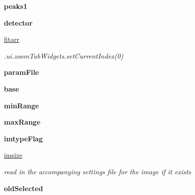 \begin{DoxyCompactItemize}
\item 
\hypertarget{classAtrex_1_1Atrex_ace3b741c1a559e2117246a53d3e8f345}{{\bfseries peaks1}}\label{classAtrex_1_1Atrex_ace3b741c1a559e2117246a53d3e8f345}

\item 
\hypertarget{classAtrex_1_1Atrex_a47354f98e68c5aadcd988d0a2b476889}{{\bfseries detector}}\label{classAtrex_1_1Atrex_a47354f98e68c5aadcd988d0a2b476889}

\item 
\hypertarget{classAtrex_1_1Atrex_a7efc2659254ab5a5f065a5f3fa11ceb9}{\hyperlink{classAtrex_1_1Atrex_a7efc2659254ab5a5f065a5f3fa11ceb9}{fitarr}}\label{classAtrex_1_1Atrex_a7efc2659254ab5a5f065a5f3fa11ceb9}

\begin{DoxyCompactList}\small\item\em .ui.\-zoom\-Tab\-Widgets.\-set\-Current\-Index(0) \end{DoxyCompactList}\item 
\hypertarget{classAtrex_1_1Atrex_a804307169058c96d52235bacc92d6f09}{{\bfseries param\-File}}\label{classAtrex_1_1Atrex_a804307169058c96d52235bacc92d6f09}

\item 
\hypertarget{classAtrex_1_1Atrex_a2080a9ed5c4661217ebd6fa108ef2e68}{{\bfseries base}}\label{classAtrex_1_1Atrex_a2080a9ed5c4661217ebd6fa108ef2e68}

\item 
\hypertarget{classAtrex_1_1Atrex_a8cb32e63ba2e1df2a5819e6df5bfd8e9}{{\bfseries min\-Range}}\label{classAtrex_1_1Atrex_a8cb32e63ba2e1df2a5819e6df5bfd8e9}

\item 
\hypertarget{classAtrex_1_1Atrex_a240f5adcbd64d4282c41fc884722d453}{{\bfseries max\-Range}}\label{classAtrex_1_1Atrex_a240f5adcbd64d4282c41fc884722d453}

\item 
\hypertarget{classAtrex_1_1Atrex_ac181165f963c93be5b4a5e79ac9100e2}{{\bfseries imtype\-Flag}}\label{classAtrex_1_1Atrex_ac181165f963c93be5b4a5e79ac9100e2}

\item 
\hypertarget{classAtrex_1_1Atrex_aaad2acdd3e1ed0343b2414934ce8c257}{\hyperlink{classAtrex_1_1Atrex_aaad2acdd3e1ed0343b2414934ce8c257}{imsize}}\label{classAtrex_1_1Atrex_aaad2acdd3e1ed0343b2414934ce8c257}

\begin{DoxyCompactList}\small\item\em read in the accompanying settings file for the image if it exists \end{DoxyCompactList}\item 
\hypertarget{classAtrex_1_1Atrex_a5a00bf83d75cef3dc64f66b7972128ac}{{\bfseries old\-Selected}}\label{classAtrex_1_1Atrex_a5a00bf83d75cef3dc64f66b7972128ac}


\end{DoxyCompactItemize}
